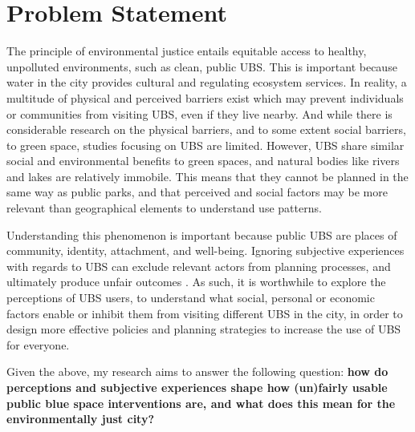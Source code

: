 \documentclass{article}
\begin{document}



\section{Problem Statement}

The principle of environmental justice entails equitable access to healthy, unpolluted environments, such as clean, public UBS. This is important because water in the city provides cultural and regulating ecosystem services.
In reality, a multitude of physical and perceived barriers exist which may prevent individuals or communities from visiting UBS, even if they live nearby. And while there is considerable research on the physical barriers, and to some extent social barriers, to green space, studies focusing on UBS are limited.
However, UBS share similar social and environmental benefits to green spaces, and natural bodies like rivers and lakes are relatively immobile. This means that they cannot be planned in the same way as public parks, and that perceived and social factors may be more relevant than geographical elements to understand use patterns.

Understanding this phenomenon is important because public UBS are places of community, identity, attachment, and well-being. Ignoring subjective experiences with regards to UBS can exclude relevant actors from planning processes, and ultimately produce unfair outcomes \parencite{plieninger2022disentangling}. 
As such, it is worthwhile to explore the perceptions of UBS users, to understand what social, personal or economic factors enable or inhibit them from visiting different UBS in the city, in order to design more effective policies and planning strategies to increase the use of UBS for everyone.

Given the above, my research aims to answer the following question: \textbf{how do perceptions and subjective experiences shape how (un)fairly usable public blue space interventions are, and what does this mean for the environmentally just city?}
\end{document}
